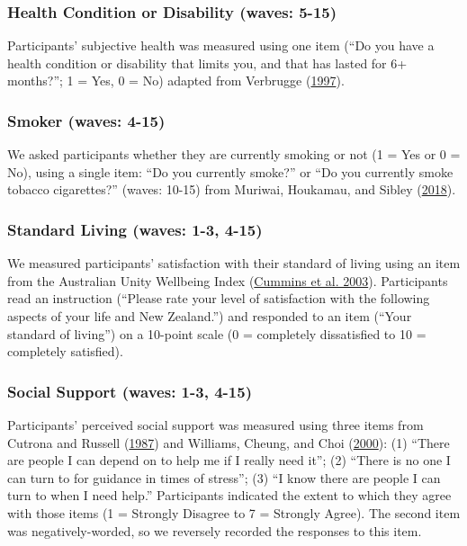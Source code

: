 \documentclass[
  singlecolumn]{report}
\begin{document}
\hypertarget{health-condition-or-disability-waves-5-15}{%
\subsubsection{Health Condition or Disability (waves:
5-15)}\label{health-condition-or-disability-waves-5-15}}

Participants' subjective health was measured using one item (``Do you
have a health condition or disability that limits you, and that has
lasted for 6+ months?''; 1 = Yes, 0 = No) adapted from Verbrugge
(\protect\hyperlink{ref-verbrugge1997}{1997}).

\hypertarget{smoker-waves-4-15}{%
\subsubsection{Smoker (waves: 4-15)}\label{smoker-waves-4-15}}

We asked participants whether they are currently smoking or not (1 = Yes
or 0 = No), using a single item: ``Do you currently smoke?'' or ``Do you
currently smoke tobacco cigarettes?'' (waves: 10-15) from Muriwai,
Houkamau, and Sibley
(\protect\hyperlink{ref-muriwai_looking_2018}{2018}).

\hypertarget{standard-living-waves-1-3-4-15}{%
\subsubsection{Standard Living (waves: 1-3,
4-15)}\label{standard-living-waves-1-3-4-15}}

We measured participants' satisfaction with their standard of living
using an item from the Australian Unity Wellbeing Index
(\protect\hyperlink{ref-cummins_developing_2003}{Cummins et al. 2003}).
Participants read an instruction (``Please rate your level of
satisfaction with the following aspects of your life and New Zealand.'')
and responded to an item (``Your standard of living'') on a 10-point
scale (0 = completely dissatisfied to 10 = completely satisfied).

\hypertarget{social-support-waves-1-3-4-15}{%
\subsubsection{Social Support (waves: 1-3,
4-15)}\label{social-support-waves-1-3-4-15}}

Participants' perceived social support was measured using three items
from Cutrona and Russell (\protect\hyperlink{ref-cutrona1987}{1987}) and
Williams, Cheung, and Choi
(\protect\hyperlink{ref-williams_cyberostracism_2000}{2000}): (1)
``There are people I can depend on to help me if I really need it''; (2)
``There is no one I can turn to for guidance in times of stress''; (3)
``I know there are people I can turn to when I need help.'' Participants
indicated the extent to which they agree with those items (1 = Strongly
Disagree to 7 = Strongly Agree). The second item was negatively-worded,
so we reversely recorded the responses to this item.
\end{document}
